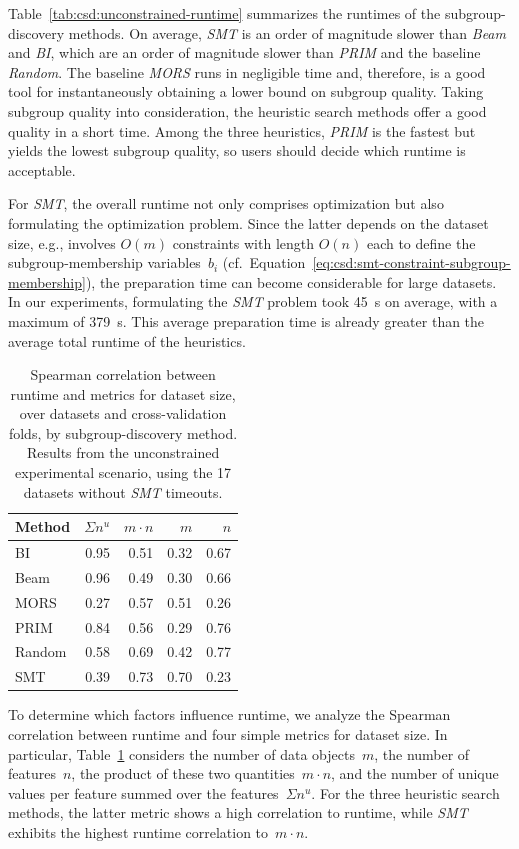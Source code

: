 \documentclass{article}
\theoremstyle{definition}
\begin{document}
Table~\ref{tab:csd:unconstrained-runtime} summarizes the runtimes of the subgroup-discovery methods.
On average, \emph{SMT} is an order of magnitude slower than \emph{Beam} and \emph{BI}, which are an order of magnitude slower than \emph{PRIM} and the baseline \emph{Random}.
The baseline \emph{MORS} runs in negligible time and, therefore, is a good tool for instantaneously obtaining a lower bound on subgroup quality.
Taking subgroup quality into consideration, the heuristic search methods
offer a good quality in a short time.
Among the three heuristics, \emph{PRIM} is the fastest but yields the lowest subgroup quality, so users should decide which runtime is acceptable.

For \emph{SMT}, the overall runtime not only comprises optimization but also formulating the optimization problem.
Since the latter depends on the dataset size, e.g., involves $O(m)$ constraints with length $O(n)$ each to define the subgroup-membership variables~$b_i$ (cf.~Equation~\ref{eq:csd:smt-constraint-subgroup-membership}), the preparation time can become considerable for large datasets.
In our experiments, formulating the \emph{SMT} problem took 45~s on average, with a maximum of 379~s.
This average preparation time is already greater than the average total runtime of the heuristics.

\begin{table}[t]
	\centering
	\begin{tabular}{lrrrr}
		\toprule
		Method & $\Sigma n^u$ & $m \cdot n$ & $m$ & $n$ \\
		\midrule
		BI & 0.95 & 0.51 & 0.32 & 0.67 \\
		Beam & 0.96 & 0.49 & 0.30 & 0.66 \\
		MORS & 0.27 & 0.57 & 0.51 & 0.26 \\
		PRIM & 0.84 & 0.56 & 0.29 & 0.76 \\
		Random & 0.58 & 0.69 & 0.42 & 0.77 \\
		SMT & 0.39 & 0.73 & 0.70 & 0.23 \\
		\bottomrule
	\end{tabular}
	\caption{
		Spearman correlation between runtime and metrics for dataset size,
		over datasets and cross-validation folds, by subgroup-discovery method.
		Results from the unconstrained experimental scenario, using the 17 datasets without \emph{SMT} timeouts.
	}
	\label{tab:csd:unconstrained-runtime-correlation}
\end{table}

To determine which factors influence runtime, we analyze the Spearman correlation between runtime and four simple metrics for dataset size.
In particular, Table~\ref{tab:csd:unconstrained-runtime-correlation} considers the number of data objects~$m$, the number of features~$n$, the product of these two quantities~$m \cdot n$, and the number of unique values per feature summed over the features~$\Sigma n^u$.
For the three heuristic search methods, the latter metric shows a high correlation to runtime, while \emph{SMT} exhibits the highest runtime correlation to~$m \cdot n$.
\end{document}
